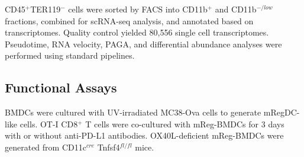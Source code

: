 \documentclass[11pt]{article}
\begin{document}
CD45$^+$TER119$^-$ cells were sorted by FACS into CD11b$^+$ and CD11b$^{-/low}$ fractions, combined for scRNA-seq analysis, and annotated based on transcriptomes. Quality control yielded 80,556 single cell transcriptomes. Pseudotime, RNA velocity, PAGA, and differential abundance analyses were performed using standard pipelines.

\subsection{Functional Assays}

BMDCs were cultured with UV-irradiated MC38-Ova cells to generate mRegDC-like cells. OT-I CD8$^+$ T cells were co-cultured with mReg-BMDCs for 3 days with or without anti-PD-L1 antibodies. OX40L-deficient mReg-BMDCs were generated from CD11c$^{cre}$ Tnfsf4$^{fl/fl}$ mice.


\end{document}
